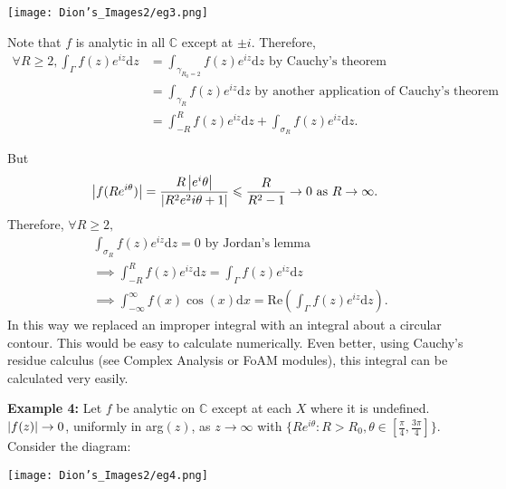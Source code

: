 \centerline{\texttt{[image: Dion's\_Images2/eg3.png]}}

Note that $f$ is analytic in all $\mathbb{C}$ except at $\pm i$.
Therefore,
\begin{align*}
\forall R \geq 2, \int_\Gamma f(z) e^{iz} \mathrm{d}z &= \int_{\gamma_{R_0=2}}f(z) e^{iz} \mathrm{d}z \mbox{ by Cauchy's theorem} \\
&= \int_{\gamma_R} f(z) e^{iz} \mathrm{d}z \mbox{ by another application of Cauchy's theorem} \\
&= \int_{-R}^R f(z) e^{iz} \mathrm{d}z + \int_{\sigma_R} f(z) e^{iz} \mathrm{d}z.
\end{align*}

But
$$\left\lvert f(Re^{i\theta})\right\rvert = \frac{R\left\lvert e^i\theta\right\rvert}{\left\lvert R^2 e^2i\theta + 1\right\rvert} \leqslant \frac{R}{R^2 - 1} \rightarrow 0 \mbox{ as } R \rightarrow \infty.$$
Therefore, $\forall R \geq 2,$
\begin{align*}
&\int_{\sigma_R} f(z) e^{iz} \mathrm{d}z = 0 \mbox{ by Jordan's lemma} \\
&\implies \int_{-R}^R f(z) e^{iz} \mathrm{d}z = \int_\Gamma f(z) e^{iz} \mathrm{d}z \\
&\implies \int_{-\infty}^\infty f(x) \cos(x) \mathrm{d}x = \mbox{Re}\left(\int_\Gamma f(z) e^{iz} \mathrm{d}z\right).
\end{align*}
In this way we replaced an improper integral with an integral about a circular contour.
This would be easy to calculate numerically.
Even better, using Cauchy's residue calculus (see Complex Analysis or FoAM modules),
this integral can be calculated very easily.

\medskip\textbf{Example 4:}
Let $f$ be analytic on $\mathbb{C}$ except at each $X$ where it is undefined.
$\left\lvert f(z)\right\rvert \rightarrow 0$, uniformly in arg$(z)$, as $z \rightarrow \infty$ with $\{Re^{i\theta}: R > R_0, \theta \in [\frac{\pi}{4}, \frac{3\pi}{4}]\}$.
Consider the diagram:

\centerline{\texttt{[image: Dion's\_Images2/eg4.png]}}

